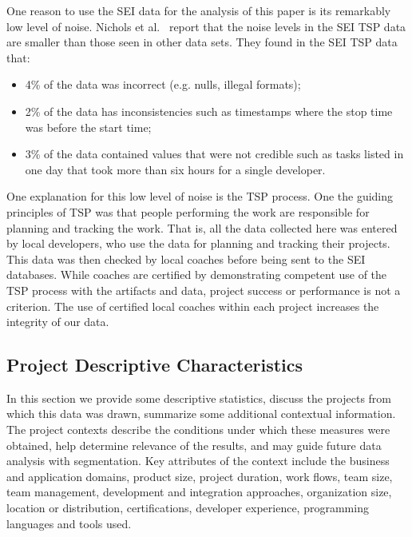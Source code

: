 \documentclass[smallcondensed]{svjour3}
\newcommand{\todo}[1]{\textcolor{Maroon}{TODO: #1}}
\newcommand{\bi}{\begin{itemize}}%
\newcommand{\ei}{\end{itemize}}
\begin{document}
One reason to use the SEI data for the analysis of this paper is its remarkably low level of noise.
Nichols et al.~\cite{shirai14}  report that
the noise levels in the SEI TSP data are smaller than those seen
in other data sets. They found in the SEI TSP data that:\bi 
\item
4\% of the data was incorrect (e.g. nulls, illegal formats);
\item  2\% of the data has inconsistencies such as timestamps
where the stop time was before the start time;
\item 3\% of the data contained values that were not credible
such as tasks listed in one day that took more than six hours for a single developer.
\ei 
One explanation for this low level of noise is the TSP process.
One the guiding principles of TSP was that  people performing the work are  responsible for planning and tracking the work. That is,  all the data collected here was entered
by local developers, who use the data for planning and tracking their projects. This data was then checked by local coaches before being sent to the SEI
databases. While coaches are certified by demonstrating competent use of the TSP process with the artifacts and data,  project success or performance is not a criterion. 
The use of certified local coaches within each project increases the integrity of our data.


 

\subsection{Project Descriptive Characteristics}
\label{sect:data_character}

In this section we provide some descriptive statistics, discuss the projects from which this data was drawn, summarize some additional contextual information. The project contexts describe the conditions under which these measures were obtained, help determine relevance of the results, and may guide future data analysis with segmentation. Key attributes of the context include the business and application domains, product size, project duration,  work flows, team size, team management,  development and integration approaches, organization size, location or distribution, certifications, developer experience, programming languages and tools used. 
\end{document}
